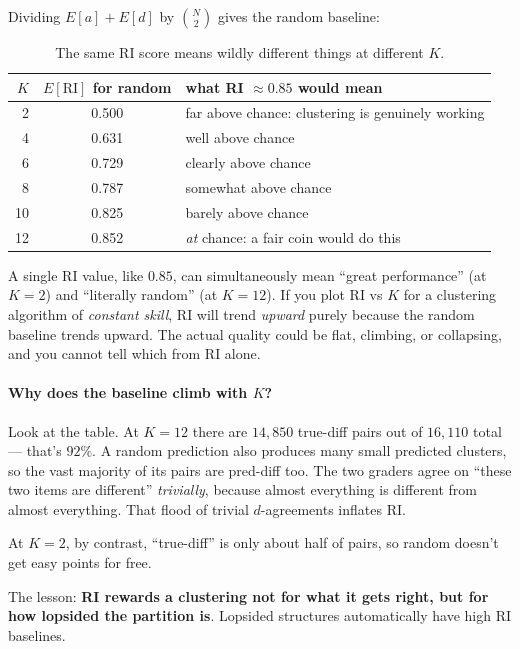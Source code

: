 \documentclass[11pt]{article}
\begin{document}
\noindent
Dividing $E[a] + E[d]$ by $\binom{N}{2}$ gives the random baseline:

\begin{table}[H]
\centering
\small
\begin{tabular}{r c l}
\toprule
$K$ & $E[\text{RI}]$ for random & what RI $\approx 0.85$ would mean \\
\midrule
2  & 0.500 & far above chance: clustering is genuinely working \\
4  & 0.631 & well above chance \\
6  & 0.729 & clearly above chance \\
8  & 0.787 & somewhat above chance \\
10 & 0.825 & barely above chance \\
12 & 0.852 & \emph{at} chance: a fair coin would do this \\
\bottomrule
\end{tabular}
\caption{The same RI score means wildly different things at different $K$.}
\label{tab:rkillertable}
\end{table}

\begin{keybox}[title={The killer}]
A single RI value, like $0.85$, can simultaneously mean ``great
performance'' (at $K = 2$) and ``literally random'' (at $K = 12$). If you
plot RI vs $K$ for a clustering algorithm of \emph{constant skill}, RI
will trend \emph{upward} purely because the random baseline trends
upward. The actual quality could be flat, climbing, or collapsing, and
you cannot tell which from RI alone.
\end{keybox}

\paragraph{Why does the baseline climb with $K$?}
Look at the table. At $K = 12$ there are $14{,}850$ true-diff pairs out of
$16{,}110$ total --- that's $92\%$. A random prediction also produces
many small predicted clusters, so the vast majority of its pairs are
pred-diff too. The two graders agree on ``these two items are different''
\emph{trivially}, because almost everything is different from almost
everything. That flood of trivial $d$-agreements inflates RI.

At $K = 2$, by contrast, ``true-diff'' is only about half of pairs, so
random doesn't get easy points for free.

The lesson: \textbf{RI rewards a clustering not for what it gets right,
but for how lopsided the partition is}. Lopsided structures
automatically have high RI baselines.
\end{document}
